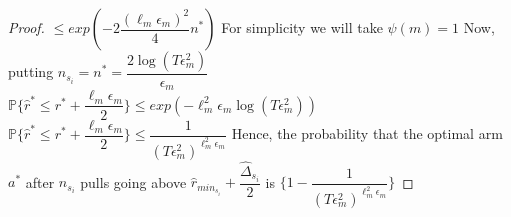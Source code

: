 \begin{proof}
$\leq exp(-2\dfrac{(\ell_{m}\epsilon_{m})^{2}}{4} n^{*})$
\newline For simplicity we will take $\psi(m)=1$
\newline Now, putting $n_{s_{i}}=n^{*}=\dfrac{2\log (T\epsilon_{m}^{2})}{\epsilon_{m}}$
\newline$\mathbb{P}\lbrace\hat{r}^{*}\leq{r}^{*} +  \dfrac{\ell_{m}\epsilon_{m}}{2}\rbrace\leq exp(-\ell_{m}^{2}\epsilon_{m} \log(T\epsilon_{m}^{2}))$
\newline $\mathbb{P}\lbrace\hat{r}^{*}\leq{r}^{*} +  \dfrac{\ell_{m}\epsilon_{m}}{2}\rbrace\leq \dfrac{1}{(T\epsilon_{m}^{2})^{\ell_{m}^{2}\epsilon_{m}}}$
\newline
Hence, the probability that the optimal arm $a^{*}$ after $n_{s_{i}}$ pulls going above $\hat{r}_{min_{s_{i}}}+\dfrac{\hat{\Delta}_{s_{i}}}{2}$ is $\bigg\lbrace 1- \dfrac{1}{(T\epsilon_{m}^{2})^{\ell_{m}^{2}\epsilon_{m}}} \bigg\rbrace$

\end{proof}

